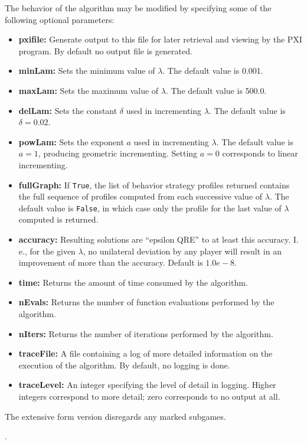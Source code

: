 The behavior of the algorithm may be modified by specifying some of the
following optional parameters:
\begin{itemize}
\item
\textbf{pxifile:} Generate output to this file for later retrieval and viewing by
the PXI program.  By default no output file is generated.
\item
\textbf{minLam:} Sets the minimum value of $\lambda$.  The 
default value is 0.001.
\item
\textbf{maxLam:} Sets the maximum value of $\lambda$.  The
default value is 500.0.
\item
\textbf{delLam:} Sets the constant $\delta$ used in incrementing $\lambda$.  The
default value is $\delta=0.02$.
\item
\textbf{powLam:} Sets the exponent $a$ used in incrementing $\lambda$.  The default
value is $a=1$, producing geometric incrementing.  Setting $a=0$ corresponds
to linear incrementing.
\item
\textbf{fullGraph:} If \verb+True+, the list of behavior strategy profiles
returned contains the full sequence of profiles computed from each successive
value of $\lambda$.  The default value is \verb+False+, in which case only
the profile for the last value of $\lambda$ computed is returned.
\item
\textbf{accuracy:} Resulting solutions are ``epsilon QRE'' to at least this
accuracy.  I. e., for the given $\lambda$, no unilateral deviation by
any player will result in an improvement of more than the accuracy.
Default is $1.0e-8$.
\item
\textbf{time:} Returns the amount of time consumed by the
algorithm.
\item
\textbf{nEvals:} Returns the number of function evaluations
performed by the algorithm.
\item
\textbf{nIters:} Returns the number of iterations performed
by the algorithm.
\item
\textbf{traceFile:} A file containing a log of more detailed information on
the execution of the algorithm.  By default, no logging is done.
\item
\textbf{traceLevel:} An integer specifying the level of detail in logging.
Higher integers correspond to more detail; zero corresponds to
no output at all.
\end{itemize}

\note The extensive form version disregards any marked
subgames.

\seealso {}.

